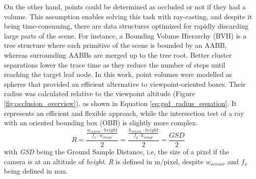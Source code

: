 On the other hand, points could be determined as occluded or not if they had a volume. This assumption enables solving this task with ray-casting, and despite it being time-consuming, there are data structures optimized for rapidly discarding large parts of the scene. For instance, a Bounding Volume Hierarchy (BVH) is a tree structure where each primitive of the scene is bounded by an AABB, whereas surrounding AABBs are merged up to the tree root. Better cluster separations lower the trace time as they reduce the number of steps until reaching the target leaf node. In this work, point volumes were modelled as spheres that provided an efficient alternative to viewpoint-oriented boxes. Their radius was calculated relative to the viewpoint altitude (Figure \ref{fig:occlusion_overview}), as shown in Equation \ref{eq:gsd_radius_equation}. It represents an efficient and flexible approach, while the intersection test of a ray with an oriented bounding box (OBB) is slightly more complex.
\begin{equation}
    \label{eq:gsd_radius_equation}
    R = \frac{\frac{w_{sensor} \cdot height}{f_x \cdot w_{image}}}{2} = \frac{\frac{h_{sensor} \cdot height}{f_y \cdot h_{image}}}{2} = \frac{\textit{GSD}}{2}
\end{equation}
with \textit{GSD} being the Ground Sample Distance, i.e, the size of a pixel if the camera is at an altitude of \textit{height}. \textit{R} is defined in \si{\meter}/pixel, despite $w_{sensor}$ and $f_x$ being defined in \si{\milli\meter}.

